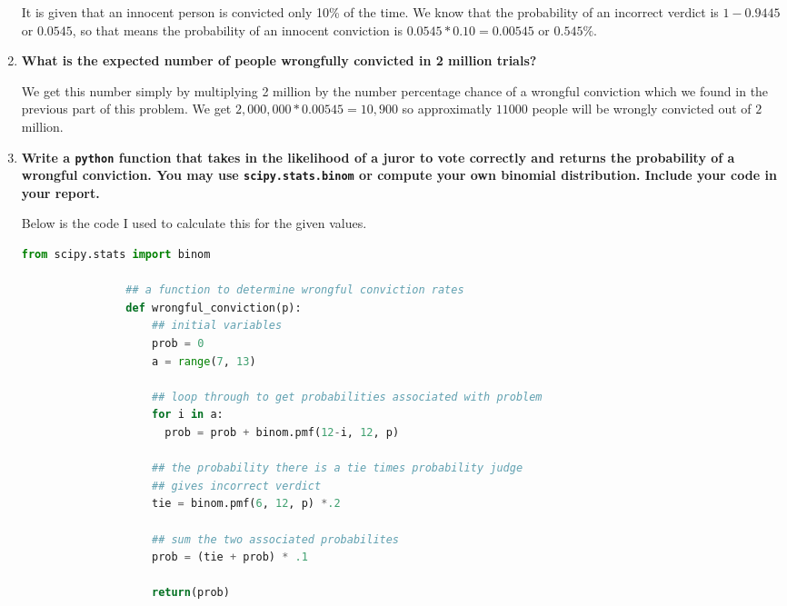 \documentclass[11pt]{article}
\begin{document}
\begin{enumerate}
            It is given that an innocent person is convicted only 10\% of the
            time. We know that the probability of an incorrect verdict is 
            $1-0.9445$ or $0.0545$, so that means the probability of an
            innocent conviction is $0.0545 * 0.10 = 0.00545$ or $0.545\%$.
        \item \textbf{What is the expected number of people wrongfully
            convicted in 2 million trials?}

            We get this number simply by multiplying 2 million by the number
            percentage chance of a wrongful conviction which we found in the
            previous part of this problem. We get $2,000,000 * 0.00545 =
            10,900$ so approximatly $11000$ people will be wrongly
            convicted out of $2$ million.
        \item \textbf{Write a \texttt{python} function that takes in the likelihood of 
            a juror to vote correctly and returns the probability of a wrongful 
            conviction. You may use \texttt{scipy.stats.binom} or compute your own 
            binomial distribution. Include your code in your report.}

            Below is the code I used to calculate this for the given values.

            \begin{lstlisting}[style=mystyle, linewidth=0.94\linewidth, 
                                language=Python, gobble=8, caption=The Program]
                from scipy.stats import binom

                ## a function to determine wrongful conviction rates
                def wrongful_conviction(p):
                    ## initial variables
                    prob = 0
                    a = range(7, 13)
                
                    ## loop through to get probabilities associated with problem
                    for i in a:
                      prob = prob + binom.pmf(12-i, 12, p)
                    
                    ## the probability there is a tie times probability judge 
                    ## gives incorrect verdict
                    tie = binom.pmf(6, 12, p) *.2
                
                    ## sum the two associated probabilites
                    prob = (tie + prob) * .1
                
                    return(prob)
            \end{lstlisting}


\end{enumerate}
\end{document}
